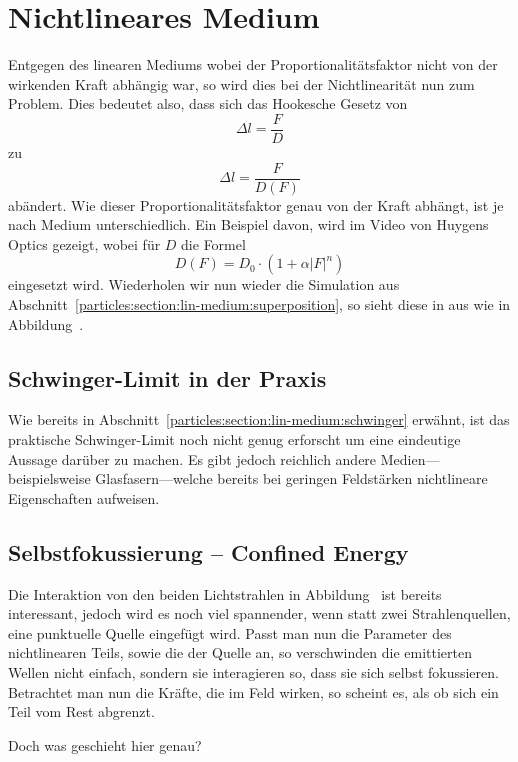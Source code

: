 %
%
%
%
\section{Nichtlineares Medium
\label{particles:section:nichtlinear}}
Entgegen des linearen Mediums wobei der Proportionalitätsfaktor nicht von der wirkenden Kraft abhängig war, 
so wird dies bei der Nichtlinearität nun zum Problem.
Dies bedeutet also, dass sich das Hookesche Gesetz von 
\[
    \Delta l
    = 
    \frac{F}{D}
\]
zu
\[
    \Delta l
    = 
    \frac{F}{D(F)}
\]
abändert. 
Wie dieser Proportionalitätsfaktor genau von der Kraft abhängt, 
ist je nach Medium unterschiedlich.
Ein Beispiel davon, wird im Video  von Huygens Optics gezeigt,
wobei für $D$ die Formel 
\[
    D(F)
    =
    D_0
    \cdot
    (1 + \alpha |F|^n)
\]
eingesetzt wird.
Wiederholen wir nun wieder die Simulation aus Abschnitt~\ref{particles:section:lin-medium:superposition}, 
so sieht diese in aus wie in Abbildung~.


\subsection{Schwinger-Limit in der Praxis}
Wie bereits in Abschnitt~\ref{particles:section:lin-medium:schwinger} erwähnt, 
ist das praktische Schwinger-Limit noch nicht genug erforscht um eine eindeutige Aussage darüber zu machen.
Es gibt jedoch reichlich andere Medien---beispielsweise Glasfasern---welche bereits bei geringen Feldstärken nichtlineare Eigenschaften aufweisen.


\subsection{Selbstfokussierung -- Confined Energy}
Die Interaktion von den beiden Lichtstrahlen in Abbildung~
ist bereits interessant, jedoch wird es noch viel spannender, 
wenn statt zwei Strahlenquellen, eine punktuelle Quelle eingefügt wird.
Passt man nun die Parameter des nichtlinearen Teils, sowie die der Quelle an, 
so verschwinden die emittierten Wellen nicht einfach, 
sondern sie interagieren so, dass sie sich selbst fokussieren.
Betrachtet man nun die Kräfte, die im Feld wirken, 
so scheint es, als ob sich ein Teil vom Rest abgrenzt.

Doch was geschieht hier genau? 

